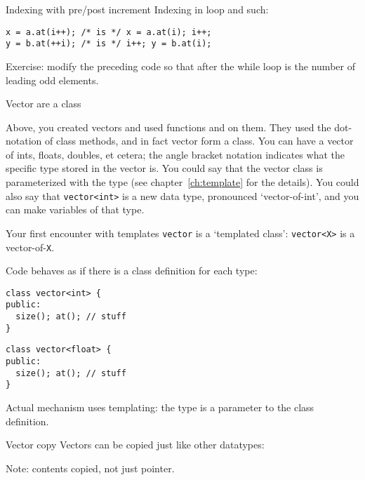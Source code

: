 \begin{slide}{Indexing with pre/post increment}
  \label{sl:prepostindex}
Indexing in  loop and such:
\begin{lstlisting}
x = a.at(i++); /* is */ x = a.at(i); i++;
y = b.at(++i); /* is */ i++; y = b.at(i);
\end{lstlisting}
\end{slide}

\begin{exercise}
  Exercise: modify the preceding code so that after the while loop
   is the number of leading odd elements.
\end{exercise}

 {Vector are a class}
\label{sec:stdvector}

Above, you created vectors and used functions  and 
on them. They used the dot-notation of class methods, and in fact
vector form a  class. You can have a vector of ints,
floats, doubles, et cetera; 
the angle bracket notation indicates what the specific type stored in
the vector is.
You could say that the vector class is parameterized with the type (see
chapter~\ref{ch:template} for the details).
You could also say that
\lstinline{vector<int>} is a new data type,
pronounced `vector-of-int', and you can
make variables of that type.

\begin{slide}{Your first encounter with templates}
  \label{sl:vector-template}
 \lstinline{vector} is a `templated class':
    \lstinline{vector<X>} is a vector-of-\lstinline{X}.

    Code behaves as if there is a class definition for each type:
    \begin{multicols}{2}
      \small
\begin{lstlisting}
class vector<int> {
public:
  size(); at(); // stuff
}
\end{lstlisting}
\begin{lstlisting}
class vector<float> {
public:
  size(); at(); // stuff
}
\end{lstlisting}
    \end{multicols}
    Actual mechanism uses templating:
    the type is a parameter to the class definition.
\end{slide}

\begin{block}{Vector copy}
  \label{sl:vectorcopy}
  Vectors can be copied just like other datatypes:
\begin{cpp4c}
    Note: contents copied, not just pointer.
\end{cpp4c}
\end{block}


